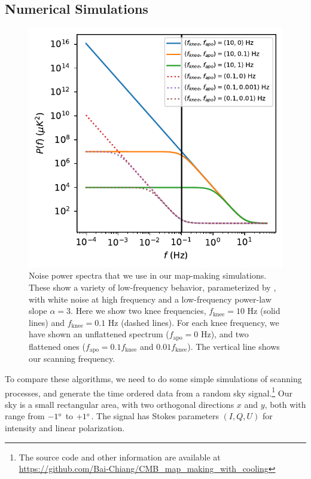 \documentclass[twocolumn,linenumbers]{aastex631}
\newcommand{\Eq}[1]{\text{Eq.\,\ref{#1}}}
\begin{document}
\begin{CJK*}{UTF8}{gbsn}
\subsection{Numerical Simulations}

\begin{figure}[tb!]
\includegraphics[width=\linewidth]{P_f.pdf}
\centering
\caption{Noise power spectra that we use in our map-making simulations.
    These show a variety of low-frequency behavior,
    parameterized by \Eq{noise power spectrum},
    with white noise at high frequency and a low-frequency power-law slope $\alpha = 3$.
    Here we show two knee frequencies, $f_\text{knee}=10$ Hz (solid lines)  
    and $f_\text{knee}=0.1$ Hz (dashed lines).
    For each knee frequency, we have shown an unflattened spectrum ($f_\text{apo}=0$ Hz), and two flattened ones ($f_\text{apo}=0.1f_\text{knee}$ and
    $0.01f_\text{knee}$).
    The vertical line shows our scanning frequency.
}
\label{power spectrum}
\end{figure}

To compare these algorithms, we need to do some simple {simulations} of scanning
processes, and generate {the} time ordered data from a random sky signal.\footnote{
The source code and other information are available at \url{https://github.com/Bai-Chiang/CMB_map_making_with_cooling}
}
Our sky is a small rectangular area, with two orthogonal directions $x$ and
$y$, both with range from $-1\degree$ to $+1\degree$.
The signal has Stokes parameters $(I,Q,U)$ for intensity and linear polarization.


\end{CJK*}
\end{document}

